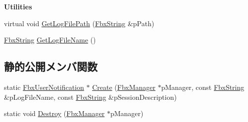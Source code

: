 \begin{Indent}\textbf{ Utilities}\par
\begin{DoxyCompactItemize}
\item 
virtual void \hyperlink{class_fbx_user_notification_af261ffb4073bb573710dc59b4881b759}{Get\+Log\+File\+Path} (\hyperlink{class_fbx_string}{Fbx\+String} \&p\+Path)
\item 
\hyperlink{class_fbx_string}{Fbx\+String} \hyperlink{class_fbx_user_notification_a65aaed76d9cba16e213bf548b10e64fd}{Get\+Log\+File\+Name} ()
\end{DoxyCompactItemize}
\end{Indent}
\subsection*{静的公開メンバ関数}
\begin{DoxyCompactItemize}
\item 
static \hyperlink{class_fbx_user_notification}{Fbx\+User\+Notification} $\ast$ \hyperlink{class_fbx_user_notification_a2b8ff6004f61e7c60b3b66e7a02fafdb}{Create} (\hyperlink{class_fbx_manager}{Fbx\+Manager} $\ast$p\+Manager, const \hyperlink{class_fbx_string}{Fbx\+String} \&p\+Log\+File\+Name, const \hyperlink{class_fbx_string}{Fbx\+String} \&p\+Session\+Description)
\item 
static void \hyperlink{class_fbx_user_notification_aebf93d0a30ccd330c04e424a6c461be1}{Destroy} (\hyperlink{class_fbx_manager}{Fbx\+Manager} $\ast$p\+Manager)
\end{DoxyCompactItemize}
